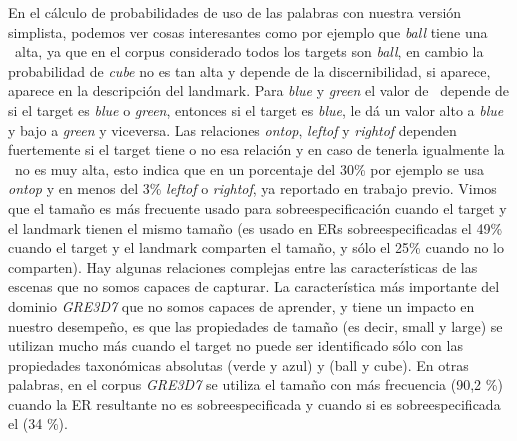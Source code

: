 En el c\'alculo de probabilidades de uso de las palabras con nuestra versi\'on simplista, podemos ver cosas interesantes como por ejemplo que {\it ball} tiene una \puse\ alta, ya que en el corpus considerado todos los targets son {\it ball}, en cambio la probabilidad de {\it cube} no es tan alta y depende de la discernibilidad, si aparece, aparece en la descripci\'on del landmark. Para {\it blue} y {\it green} el valor de \puse\ depende de si el target es {\it blue} o {\it green}, entonces si el target es {\it blue}, le d\'a un valor alto a {\it blue} y bajo a {\it green} y viceversa. Las relaciones {\it ontop}, {\it leftof} y {\it rightof} dependen fuertemente si el target tiene o no esa relaci\'on y en caso de tenerla igualmente la \puse\ no es muy alta, esto indica que en un porcentaje del 30\% por ejemplo se usa {\it ontop} y en menos del 3\% {\it leftof} o {\it rightof}, ya reportado en trabajo previo. Vimos que el tama\~no es m\'as frecuente usado para sobreespecificaci\'on cuando el target y el landmark tienen el mismo tama\~no (es usado en ERs sobreespecificadas el 49\% cuando el target y el landmark comparten el tama\~no, y s\'olo el 25\% cuando no lo comparten).
Hay algunas relaciones complejas entre las caracter\'{i}sticas de las escenas que no somos capaces de
capturar. La caracter\'{i}stica m\'as importante del dominio \textit{GRE3D7}
que no somos capaces de aprender, y tiene un impacto en nuestro desempe\~no, es que
las propiedades de tama\~no (es decir, small y large) se utilizan mucho
m\'as cuando el target no puede ser identificado s\'olo con las propiedades taxon\'omicas absolutas 
(verde y azul) y (ball y cube). En otras palabras, en el corpus \textit{GRE3D7} se utiliza el tama\~no con m\'as frecuencia (90,2 \%)
cuando la ER resultante no es sobreespecificada y cuando si es sobreespecificada el (34 \%). 
